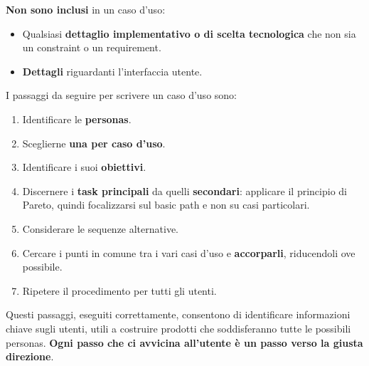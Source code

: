 \textbf{Non sono inclusi} in un caso d'uso:
\begin{itemize}
	\itemsep-0.3em
	\item Qualsiasi \textbf{dettaglio implementativo o di scelta tecnologica} che non sia un constraint o un requirement.
	\item \textbf{Dettagli} riguardanti l'interfaccia utente.
\end{itemize}

I passaggi da seguire per scrivere un caso d'uso sono:

\begin{enumerate}
	\itemsep-0.3em
	\item Identificare le \textbf{personas}.
	\item Sceglierne \textbf{una per caso d'uso}.
	\item Identificare i suoi \textbf{obiettivi}.
	\item Discernere i \textbf{task principali} da quelli \textbf{secondari}: applicare il principio di Pareto, quindi focalizzarsi sul basic path e
	non su casi particolari.
	\item Considerare le sequenze alternative.
	\item Cercare i punti in comune tra i vari casi d'uso e \textbf{accorparli}, riducendoli ove possibile.
	\item Ripetere il procedimento per tutti gli utenti.
\end{enumerate}

Questi passaggi, eseguiti correttamente, consentono di identificare informazioni chiave sugli utenti, utili a costruire prodotti che soddisferanno
tutte le possibili personas. \textbf{Ogni passo che ci avvicina all'utente è un passo verso la giusta direzione}.